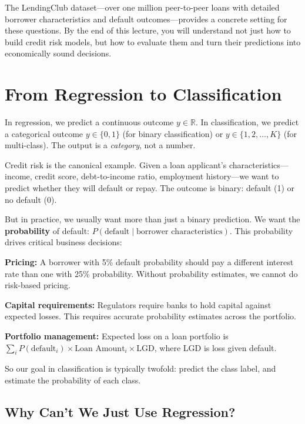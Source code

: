 \documentclass[11pt,a4paper]{article}
\newcommand{\keyword}[1]{\textbf{\textcolor{AccentOrange}{#1}}}
\begin{document}
The LendingClub dataset---over one million peer-to-peer loans with detailed borrower characteristics and default outcomes---provides a concrete setting for these questions. By the end of this lecture, you will understand not just how to build credit risk models, but how to evaluate them and turn their predictions into economically sound decisions.

\section{From Regression to Classification}

In regression, we predict a continuous outcome $y \in \mathbb{R}$. In classification, we predict a categorical outcome $y \in \{0, 1\}$ (for binary classification) or $y \in \{1, 2, \ldots, K\}$ (for multi-class). The output is a \emph{category}, not a number.

Credit risk is the canonical example. Given a loan applicant's characteristics---income, credit score, debt-to-income ratio, employment history---we want to predict whether they will default or repay. The outcome is binary: default (1) or no default (0).

But in practice, we usually want more than just a binary prediction. We want the \keyword{probability} of default: $P(\text{default} \mid \text{borrower characteristics})$. This probability drives critical business decisions:

\textbf{Pricing:} A borrower with 5\% default probability should pay a different interest rate than one with 25\% probability. Without probability estimates, we cannot do risk-based pricing.

\textbf{Capital requirements:} Regulators require banks to hold capital against expected losses. This requires accurate probability estimates across the portfolio.

\textbf{Portfolio management:} Expected loss on a loan portfolio is $\sum_i P(\text{default}_i) \times \text{Loan Amount}_i \times \text{LGD}$, where LGD is loss given default.

So our goal in classification is typically twofold: predict the class label, and estimate the probability of each class.

\subsection{Why Can't We Just Use Regression?}
\end{document}
